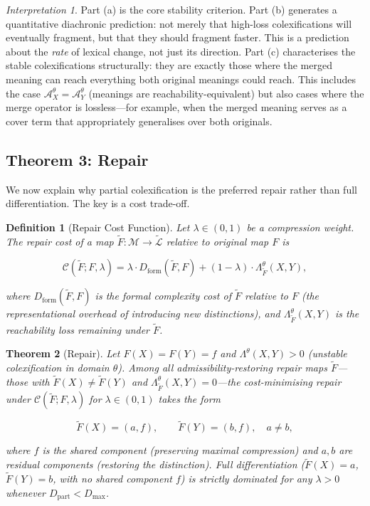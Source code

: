 \documentclass[12pt]{article}
\theoremstyle{rthm}
\newtheorem{theorem}{Theorem}[section]
\theoremstyle{rdef}
\newtheorem{definition}[theorem]{Definition}
\theoremstyle{remark}
\newtheorem*{interpretation}{Interpretation}
\newcommand{\M}{\mathcal{M}}
\newcommand{\A}{\mathcal{A}}
\newcommand{\Lam}[1][\theta]{\Lambda^{#1}}
\newcommand{\Ftil}{\widetilde{F}}
\newcommand{\Ltil}{\widetilde{\mathcal{L}}}
\begin{document}
\begin{interpretation}
Part (a) is the core stability criterion. Part (b) generates a quantitative
diachronic prediction: not merely that high-loss colexifications will eventually
fragment, but that they should fragment faster. This is a prediction about the
\emph{rate} of lexical change, not just its direction. Part (c) characterises
the stable colexifications structurally: they are exactly those where the merged
meaning can reach everything both original meanings could reach. This includes
the case $\A_X^{\theta} = \A_Y^{\theta}$ (meanings are reachability-equivalent)
but also cases where the merge operator is lossless---for example, when the
merged meaning serves as a cover term that appropriately generalises over both
originals.
\end{interpretation}

\subsection{Theorem 3: Repair}
\label{subsec:t3}

We now explain why partial colexification is the preferred repair rather than
full differentiation. The key is a cost trade-off.

\begin{definition}[Repair Cost Function]
\label{def:repair-cost}
Let $\lambda \in (0,1)$ be a compression weight. The \emph{repair cost} of a
map $\Ftil : \M \to \Ltil$ relative to original map $F$ is

\[
\mathcal{C}(\Ftil; F, \lambda)
= \lambda \cdot D_{\mathrm{form}}(\Ftil, F)
+ (1 - \lambda) \cdot \Lambda^{\theta}_{\Ftil}(X,Y),
\]

where $D_{\mathrm{form}}(\Ftil, F)$ is the formal complexity cost of $\Ftil$
relative to $F$ (the representational overhead of introducing new distinctions),
and $\Lambda^{\theta}_{\Ftil}(X,Y)$ is the reachability loss remaining under $\Ftil$.
\end{definition}

\begin{theorem}[Repair]
\label{thm:repair}
Let $F(X) = F(Y) = f$ and $\Lam(X,Y) > 0$ (unstable colexification in domain
$\theta$). Among all \emph{admissibility-restoring} repair maps $\Ftil$---those
with $\Ftil(X) \neq \Ftil(Y)$ and $\Lambda^{\theta}_{\Ftil}(X,Y) = 0$---the
cost-minimising repair under $\mathcal{C}(\Ftil; F, \lambda)$ for $\lambda \in
(0,1)$ takes the form

\[
\Ftil(X) = (a, f), \qquad \Ftil(Y) = (b, f), \quad a \neq b,
\]

where $f$ is the shared component (preserving maximal compression) and $a, b$
are residual components (restoring the distinction). Full differentiation
($\Ftil(X) = a$, $\Ftil(Y) = b$, with no shared component $f$) is strictly
dominated for any $\lambda > 0$ whenever $D_{\mathrm{part}} < D_{\max}$.
\end{theorem}
\end{document}
